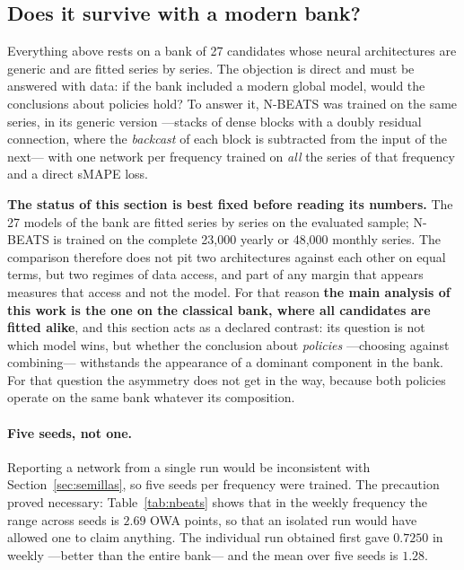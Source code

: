 \subsection{Does it survive with a modern bank?}\label{sec:nbeats}

Everything above rests on a bank of 27 candidates whose neural architectures are generic
and are fitted series by series. The objection is direct and must be answered with data:
if the bank included a modern global model, would the conclusions about policies hold? To
answer it, N-BEATS \cite{oreshkin2020} was trained on the same series, in its generic
version ---stacks of dense blocks with a doubly residual connection, where the
\emph{backcast} of each block is subtracted from the input of the next--- with one network
per frequency trained on \emph{all} the series of that frequency and a direct sMAPE loss.

\textbf{The status of this section is best fixed before reading its numbers.} The 27
models of the bank are fitted series by series on the evaluated sample; N-BEATS is trained
on the complete 23{,}000 yearly or 48{,}000 monthly series. The comparison therefore does
not pit two architectures against each other on equal terms, but two regimes of data
access, and part of any margin that appears measures that access and not the model. For
that reason \textbf{the main analysis of this work is the one on the classical bank, where
all candidates are fitted alike}, and this section acts as a declared contrast: its
question is not which model wins, but whether the conclusion about \emph{policies}
---choosing against combining--- withstands the appearance of a dominant component in the
bank. For that question the asymmetry does not get in the way, because both policies
operate on the same bank whatever its composition.

\paragraph{Five seeds, not one.} Reporting a network from a single run would be
inconsistent with Section~\ref{sec:semillas}, so five seeds per frequency were trained.
The precaution proved necessary: Table~\ref{tab:nbeats} shows that in the weekly frequency
the range across seeds is $2.69$ OWA points, so that an isolated run would have allowed
one to claim anything. The individual run obtained first gave $0.7250$ in weekly ---better
than the entire bank--- and the mean over five seeds is $1.28$.

